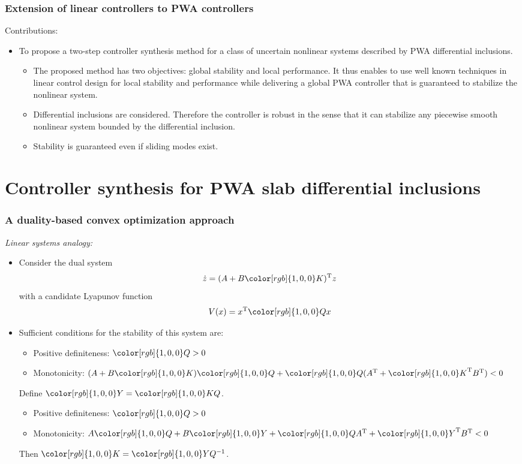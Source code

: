 \documentclass{beamer}
\newcommand{\red}{\color[rgb]{1,0,0}}
\newcommand{\TR}{\text{T}}
\newcommand{\beq}{\begin{equation*}}
\newcommand{\eeq}{\end{equation*}}
\begin{document}
 \frame
  {
    \frametitle{Extension of linear controllers to PWA controllers}
    Contributions:
    \begin{itemize}
    \item To propose a two-step controller synthesis method for a class of uncertain nonlinear systems described by PWA differential inclusions.
    \begin{itemize}
    \item The proposed method has two objectives: global stability and local performance. It thus enables to use well known techniques in linear control design for local stability and performance while delivering a global PWA controller that is guaranteed to stabilize the nonlinear system.
    \item Differential inclusions are considered. Therefore the controller is robust in the sense that it can stabilize any piecewise smooth nonlinear system bounded by the differential inclusion.
    \item Stability is guaranteed even if sliding modes exist.
    \end{itemize}
    \end{itemize}
}  



  \section[]{Controller synthesis for PWA slab differential inclusions}
  \frame
  {
    \frametitle{A duality-based convex optimization approach}
\emph{Linear systems analogy:}
\begin{itemize}
    \item Consider the dual system 
    \beq
    \dot z=(A+B{\red K})^\TR z
    \eeq 
    with a candidate Lyapunov function 
    \beq
    V(x)=x^\TR {\red Q}x
    \eeq 
    \item Sufficient conditions for the stability of this system are: 
    \begin{itemize}
    \item Positive definiteness: ${\red Q}>0$
    \item Monotonicity: $(A+B{\red K}) {\red Q}+{\red Q}(A^\TR+{\red K}^\TR B^\TR)<0$
    \end{itemize}
    Define ${\red Y}={\red KQ}$.
    \begin{itemize}
    \item Positive definiteness: ${\red Q}>0$
    \item Monotonicity: $A{\red Q}+B{\red Y} +{\red Q}A^\TR+{\red Y}^\TR B^\TR<0$
    \end{itemize}
    Then ${\red K}={\red YQ^{-1}}$.
    \end{itemize}
  }
  
\end{document}
